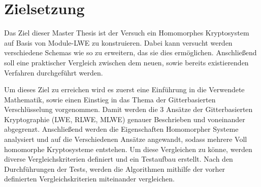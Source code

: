 \chapter{Zielsetzung}
\label{Zielsetzung}

Das Ziel dieser Master Thesis ist der Versuch ein Homomorphes Kryptosystem auf Basis von Module-LWE zu konstruieren. Dabei kann versucht werden verschiedene Schemas wie \cite{BGV} so zu erweitern, das sie dies ermöglichen. Anschließend soll eine praktischer Vergleich zwischen dem neuen, sowie bereits existierenden Verfahren durchgeführt werden.

Um dieses Ziel zu erreichen wird es zuerst eine Einführung in die Verwendete Mathematik, sowie einen Einstieg in das Thema der Gitterbasierten Verschlüsselung vorgenommen. Damit werden die 3 Ansätze der Gitterbasierten Kryptographie (LWE, RLWE, MLWE) genauer Beschrieben und voneinander abgegrenzt. Anschließend werden die Eigenschaften Homomorpher Systeme analysiert und auf die Verschiedenen Ansätze angewandt, sodass mehrere Voll homomorphe Kryptosysteme entstehen. Um diese Vergleichen zu könne, werden diverse Vergleichskriterien definiert und ein Testaufbau erstellt. Nach den Durchführungen der Tests, werden die Algorithmen mithilfe der vorher definierten Vergleichskriterien miteinander vergleichen.
